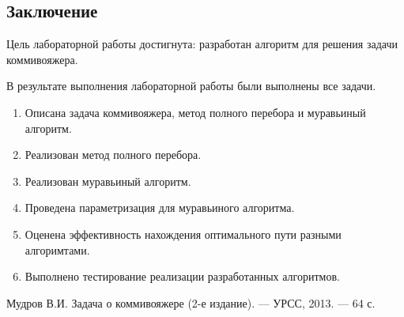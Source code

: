 \documentclass[12pt, a4paper]{article}
\begin{document}
\newpage
\begin{center}
    \section*{Заключение}
\end{center}

Цель лабораторной работы достигнута: разработан алгоритм для решения задачи коммивояжера.

В результате выполнения лабораторной работы были выполнены все задачи.
\begin{enumerate}
\item Описана задача коммивояжера, метод полного перебора и муравьиный алгоритм. 
\item Реализован метод полного перебора.
\item Реализован муравьиный алгоритм.
\item Проведена параметризация для муравьиного алгоритма.
\item Оценена эффективность нахождения оптимального пути разными алгоримтами.
\item Выполнено тестирование реализации разработанных алгоритмов.
\end{enumerate}

\newpage
\begin{center}
\begin{thebibliography}{}
 Мудров В.И. Задача о коммивояжере (2-е издание). --- УРСС, 2013. --- 64 с.
\end{thebibliography}
\end{center}
\end{document}
